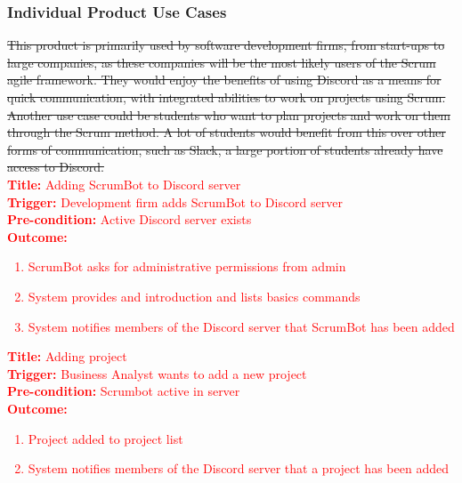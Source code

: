\documentclass[12pt, titlepage]{article}
\begin{document}
\subsubsection{Individual Product Use Cases}
\sout{This product is primarily used by software development firms, from start-ups to large companies, as these companies will be the most likely users of the Scrum agile framework. They would enjoy the benefits of using Discord as a means for quick communication, with integrated abilities to work on projects using Scrum.}\\

\sout{Another use case could be students who want to plan projects and work on them through the Scrum method. A lot of students would benefit from this over other forms of communication, such as Slack, a large portion of students already have access to Discord.}\\

\noindent \textcolor{red}{\textbf{Title: }Adding ScrumBot to Discord server}\\
\textcolor{red}{\textbf{Trigger: }Development firm adds ScrumBot to Discord server}\\
\textcolor{red}{\textbf{Pre-condition: }Active Discord server exists}\\
\textcolor{red}{\textbf{Outcome: }}
\textcolor{red}{
\begin{enumerate}
    \item ScrumBot asks for administrative permissions from admin
    \item System provides and introduction and lists basics commands
    \item System notifies members of the Discord server that ScrumBot has been added
\end{enumerate}
}

\noindent \textcolor{red}{\textbf{Title: }Adding project}\\
\textcolor{red}{\textbf{Trigger: }Business Analyst wants to add a new project}\\
\textcolor{red}{\textbf{Pre-condition: }Scrumbot active in server}\\
\textcolor{red}{\textbf{Outcome: }}
\textcolor{red}{
\begin{enumerate}
    \item Project added to project list
    \item System notifies members of the Discord server that a project has been added
\end{enumerate}
}
\end{document}
